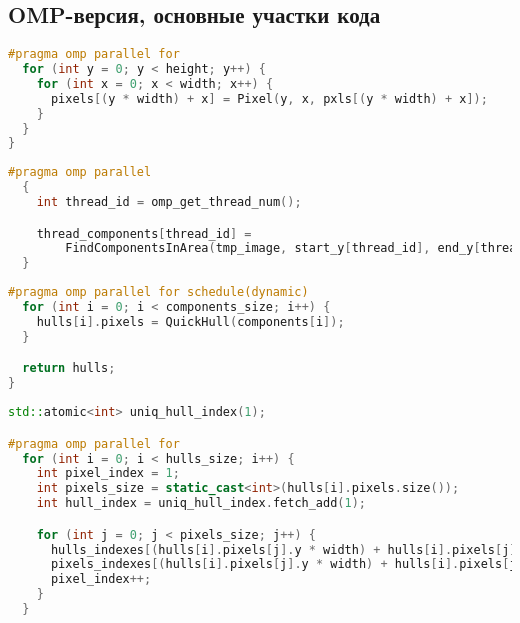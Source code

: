 \documentclass[12pt]{article}
\begin{document}
\subsection{OMP-версия, основные участки кода}
\label{appendix:omp_1}
\begin{lstlisting}[language=C++, caption={OMP-версия, Создание объекта Image в конструкторе Image::Image()}]
#pragma omp parallel for
  for (int y = 0; y < height; y++) {
    for (int x = 0; x < width; x++) {
      pixels[(y * width) + x] = Pixel(y, x, pxls[(y * width) + x]);
    }
  }
}
\end{lstlisting}
\label{appendix:omp_2}
\begin{lstlisting}[language=C++, caption={OMP-версия, Поиск компонент по "полосам" изображения в функции FindComponentsOMP()}]
#pragma omp parallel
  {
    int thread_id = omp_get_thread_num();

    thread_components[thread_id] =
        FindComponentsInArea(tmp_image, start_y[thread_id], end_y[thread_id], index_offset[thread_id]);
  }
\end{lstlisting}
\label{appendix:omp_3}
\begin{lstlisting}[language=C++, caption={OMP-версия, Построение оболочки для каждой из компонент в функции QuickHullAllOMP()}]
#pragma omp parallel for schedule(dynamic)
  for (int i = 0; i < components_size; i++) {
    hulls[i].pixels = QuickHull(components[i]);
  }

  return hulls;
}
\end{lstlisting}
\label{appendix:omp_4}
\begin{lstlisting}[language=C++, caption={OMP-версия, Формирование единой структуры ответа в функции PackHulls()}]
std::atomic<int> uniq_hull_index(1);

#pragma omp parallel for
  for (int i = 0; i < hulls_size; i++) {
    int pixel_index = 1;
    int pixels_size = static_cast<int>(hulls[i].pixels.size());
    int hull_index = uniq_hull_index.fetch_add(1);

    for (int j = 0; j < pixels_size; j++) {
      hulls_indexes[(hulls[i].pixels[j].y * width) + hulls[i].pixels[j].x] = hull_index;
      pixels_indexes[(hulls[i].pixels[j].y * width) + hulls[i].pixels[j].x] = pixel_index;
      pixel_index++;
    }
  }
\end{lstlisting}

\newpage
\end{document}
